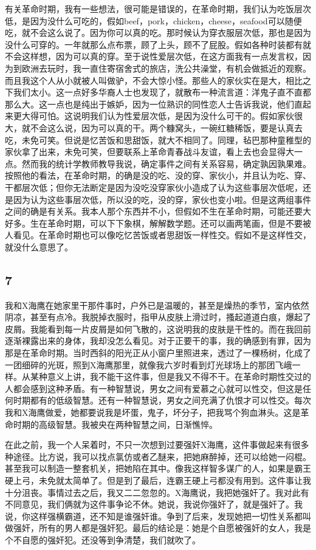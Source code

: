 有关革命时期，我有一些想法，很可能是错误的，在革命时期，我们认为吃饭层次低，是因为没什么可吃的，假如beef，pork，chicken，cheese，seafood可以随便吃，就不会这么说了。因为你可以真的吃。那时候认为穿衣服层次低，那也是因为没什么可穿的。一年就那么点布票，顾了上头，顾不了屁股。假如各种时装都有就不会这样想，因为可以真的穿。至于说性爱层次低，在这方面我有一点发言权，因为到欧洲去玩时，我一直住寄宿舍式的旅店，洗公共澡堂，有机会做抵近的观察。而且我这个人从小就被人叫做驴，不会大惊小怪。那些人的家伙实在是大，相比之下我们太小。这一点好多华裔人士也发现了，就散布一种流言道：洋鬼子直不直都那么大。这一点也是纯出于嫉妒，因为一位熟识的同性恋人士告诉我说，他们直起来更大得可怕。这说明我们认为性爱层次低，是因为没什么可干的。假如家伙很大，就不会这么说，因为可以真的干。两个糠窝头，一碗红糖稀饭，要是认真去吃，未免可笑。但说是忆苦饭和思甜饭，就大不相同了。同理，毡巴那种童稚型的家伙拿了出来，未免可笑，但要联系上革命青春战斗友谊，看上去也会显得大一点。然而我的统计学教师教导我说，确定事件之间有关系容易，确定孰因孰果难。按照他的看法，在革命时期，的确是没的吃、没的穿、家伙小，并且认为吃、穿、干都层次低；但你无法断定是因为没吃没穿家伙小造成了认为这些事层次低呢，还是因为认为这些事层次低，所以没的吃，没的穿，家伙也变小啦。但是这两组事件之间的确是有关系。我本人那个东西并不小，但假如不生在革命时期，可能还要大好多。生在革命时期，可以下下象棋，解解数学题。还可以画两笔画，但是不要被人看见。在革命时期也可以像吃忆苦饭或者思甜饭一样性交。假如不是这样性交，就没什么意思了。 

\subsection{7} 

我和X海鹰在她家里干那件事时，户外已是温暖的，甚至是燥热的季节，室内依然阴凉，甚至有点冷。我脱掉衣服时，指甲从皮肤上滑过时，搔起道道白痕，爆起了皮屑。我能看到每一片皮屑是如何飞散的，这说明我的皮肤是干性的。而在我回前逐渐裸露出来的身体，我却没怎么看见。对于正要干的事，我的确感到有罪，因为那是在革命时期。当时西斜的阳光正从小窗户里照进来，透过了一棵杨树，化成了一团细碎的光斑，照到X海鹰那里，就像我六岁时看到灯光球场上的那团飞峨一样。从某种意义上讲，我不能干这件事，但是我又不得不干。在革命时期性交过的人都会感到这种矛盾。有一种智慧说，男女之间有爱慕之心就可以性交，但这是任何时期都有的低级智慧。还有一种智慧说，男女之间充满了仇恨才可以性交。每次我和X海鹰做爱，她都要说我是坏蛋，鬼子，坏分子，把我骂个狗血淋头。这是革命时期的高级智慧。我被央在两种智慧之间，日渐憔悴。 

在此之前，我一个人呆着时，不只一次想到过要强奸X海鹰，这件事做起来有很多种途径。比方说，我可以找点氯仿或者乙醚来，把她麻醉掉，还可以给她一闷棍。甚至我可以制造一整套机关，把她陷在其中。像我这样智多谋广的人，如果是霸王硬上弓，未免就太简单了。但是到了最后，连霸王硬上弓都没有用到。这件事让我十分沮丧。事情过去之后，我又二二忽忽的。X海鹰说，我把她强奸了。我对此有不同意见，我们俩就为这件事争论不休。她说，我说你强奸了，就是强奸了。我说，你这样强横霸道，还不知是谁强奸谁。争到了后来，发现她把一切性关系都叫做强奸，所有的男人都是强奸犯。最后的结论是：她是个自愿被强奸的女人，我是个不自愿的强奸犯。还没等到争清楚，我们就吹了。 

